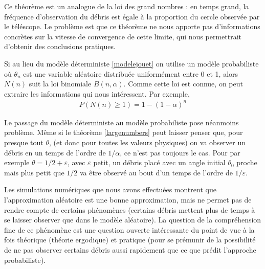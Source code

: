 \documentclass[11pt,a4paper,reqno]{article}
\newcommand{\eps}{\varepsilon}
\begin{document}
Ce théorème est un analogue de la loi des grand nombres : en temps
grand, la fréquence d'observation du débris est égale à la proportion
du cercle observée par le téléscope. Le problème est que ce théorème
ne nous apporte pas d'informations concrètes sur la vitesse de
convergence de cette limite, qui nous permettrait d'obtenir des
conclusions pratiques. 

Si au lieu du modèle déterministe \eqref{modelejouet} on utilise un
modèle probabiliste où $\theta_{n}$ est une variable aléatoire
distribuée uniformément entre 0 et 1, alors $N(n)$ suit la loi
binomiale $B(n,\alpha)$. Comme cette loi est connue, on peut extraire
les informations qui nous intéressent. Par exemple,
\begin{align}
  P(N(n) \geq 1) = 1 - (1-\alpha)^{n}
\end{align}

Le passage du modèle déterministe au modèle probabiliste pose
néanmoins problème. Même si le théorème \eqref{largenumbers} peut
laisser penser que, pour presque tout $\theta$, (et donc pour toutes
les valeurs physiques) on va observer un débris en un temps de l'ordre
de $1/\alpha$, ce n'est pas toujours le cas. Pour par exemple $\theta
= 1/2 + \eps$, avec $\eps$ petit, un débris placé avec un angle
initial $\theta_{0}$ proche mais plus petit que $1/2$ va être observé
au bout d'un temps de l'ordre de $1/\eps$.

Les simulations numériques que nous avons effectuées montrent que
l'approximation aléatoire est une bonne approximation, mais ne permet
pas de rendre compte de certains phénomènes (certains débris mettent
plus de temps à se laisser observer que dans le modèle aléatoire). La
question de la compréhension fine de ce phénomène est une question
ouverte intéressante du point de vue à la fois théorique (théorie
ergodique) et pratique (pour se prémunir de la possibilité de ne pas
observer certains débris aussi rapidement que ce que prédit l'approche
probabiliste).
\end{document}
